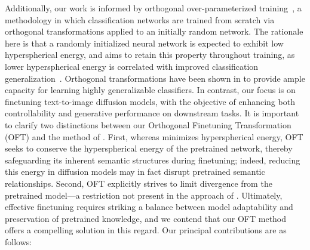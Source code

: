 Additionally, our work is informed by orthogonal over-parameterized training~\cite{liu2021orthogonal}, a methodology in which classification networks are trained from scratch via orthogonal transformations applied to an initially random network. The rationale here is that a randomly initialized neural network is expected to exhibit low hyperspherical energy, and \cite{liu2021orthogonal} aims to retain this property throughout training, as lower hyperspherical energy is correlated with improved classification generalization~\cite{liu2018learning,lin2020regularizing}. Orthogonal transformations have been shown in \cite{liu2021orthogonal} to provide ample capacity for learning highly generalizable classifiers. In contrast, our focus is on finetuning text-to-image diffusion models, with the objective of enhancing both controllability and generative performance on downstream tasks. It is important to clarify two distinctions between our Orthogonal Finetuning Transformation (OFT) and the method of \cite{liu2021orthogonal}. First, whereas \cite{liu2021orthogonal} minimizes hyperspherical energy, OFT seeks to conserve the hyperspherical energy of the pretrained network, thereby safeguarding its inherent semantic structures during finetuning; indeed, reducing this energy in diffusion models may in fact disrupt pretrained semantic relationships. Second, OFT explicitly strives to limit divergence from the pretrained model—a restriction not present in the approach of \cite{liu2021orthogonal}. Ultimately, effective finetuning requires striking a balance between model adaptability and preservation of pretrained knowledge, and we contend that our OFT method offers a compelling solution in this regard. Our principal contributions are as follows:

